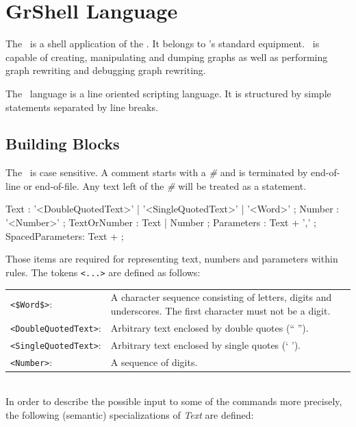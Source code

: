\chapter{GrShell Language}
\label{chapgrshell}

The \GrShell\ is a shell application of the \LibGr. It belongs to \GrG's standard equipment. \GrShell\ is capable of creating, manipulating and dumping graphs as well as performing graph rewriting and debugging graph rewriting.

The \GrShell\ language is a line oriented scripting language. It is structured by simple statements separated by line breaks.

\section{Building Blocks}

The \GrShell\ is case sensitive. A comment starts with a \emph{\#} and is terminated by end-of-line or end-of-file. Any text left of the \emph{\#} will be treated as a statement.

\begin{rail} 
 Text : '<DoubleQuotedText>' | '<SingleQuotedText>' | '<Word>' ;
 Number : '<Number>' ;
 TextOrNumber : Text | Number ;
 Parameters : Text + ',' ;
 SpacedParameters: Text + ; 
\end{rail}

Those items are required for representing text, numbers and parameters within rules. The tokens \verb+<...>+ are defined as follows:\\

\begin{tabularx}{\linewidth}{lX}
\verb+<$Word$>+:            & A character sequence consisting of letters, digits and underscores. The first character must not be a digit.\\
\verb+<DoubleQuotedText>+:  & Arbitrary text enclosed by double quotes (`` '').\\
\verb+<SingleQuotedText>+:  & Arbitrary text enclosed by single quotes (` ').\\
\verb+<Number>+:            & A sequence of digits.
\end{tabularx}\\

In order to describe the possible input to some of the commands more precisely, the following (semantic) specializations of \emph{Text} are defined:\\

